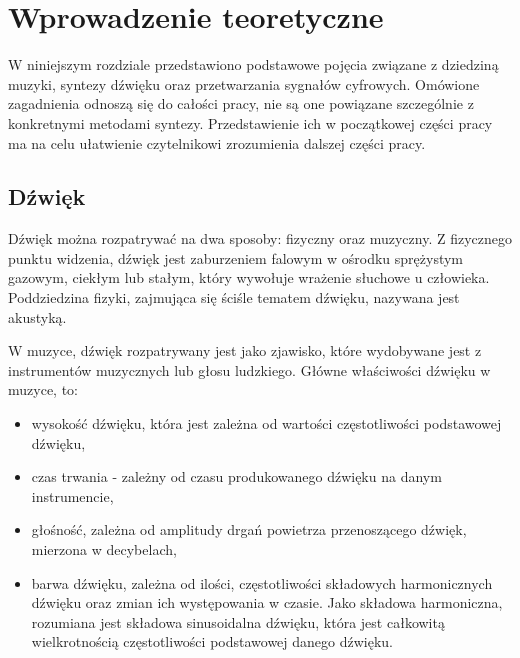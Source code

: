 \chapter{Wprowadzenie teoretyczne}\label{chapter2}

W niniejszym rozdziale przedstawiono podstawowe pojęcia związane z dziedziną muzyki, syntezy dźwięku oraz przetwarzania sygnałów cyfrowych. Omówione zagadnienia odnoszą się do całości pracy, nie są one powiązane szczególnie z konkretnymi metodami syntezy. Przedstawienie ich w początkowej części pracy ma na celu ułatwienie czytelnikowi zrozumienia dalszej części pracy.



\section{Dźwięk}
Dźwięk można rozpatrywać na dwa sposoby: fizyczny oraz muzyczny. Z fizycznego punktu widzenia, dźwięk jest zaburzeniem falowym w ośrodku sprężystym gazowym, ciekłym lub stałym, który wywołuje wrażenie słuchowe u człowieka. Poddziedzina fizyki, zajmująca się ściśle tematem dźwięku, nazywana jest akustyką.

W muzyce, dźwięk rozpatrywany jest jako zjawisko, które wydobywane jest z instrumentów muzycznych lub głosu ludzkiego. Główne właściwości dźwięku w muzyce, to:

\begin{itemize}
	\item wysokość dźwięku, która jest zależna od wartości częstotliwości podstawowej dźwięku,
	
	\item czas trwania - zależny od czasu produkowanego dźwięku na danym instrumencie,
	
	\item głośność, zależna od amplitudy drgań powietrza przenoszącego dźwięk, mierzona w decybelach,
	
	\item barwa dźwięku, zależna od ilości, częstotliwości składowych harmonicznych dźwięku oraz zmian ich występowania w czasie. Jako składowa harmoniczna, rozumiana jest składowa sinusoidalna dźwięku, która jest całkowitą wielkrotnością częstotliwości podstawowej danego dźwięku.
\end{itemize}

